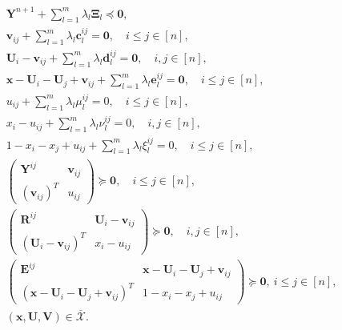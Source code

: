 \documentclass[opre,nonblindrev]{informs3} %
\begin{document}
\begin{theorem}
\begin{subequations}
\begin{align}
        &\quad \boldsymbol{Y}^{n+1} + \sum_{l=1}^{m} \lambda_l \boldsymbol{\Xi}_l \preceq \boldsymbol{0}, \label{eq:best_slc_degree4_f} \\
        &\quad \boldsymbol{v}_{ij} + \sum_{l=1}^{m} \lambda_{l} \boldsymbol{c}_l^{ij} = \boldsymbol{0}, \quad i \le j \in [n], \label{eq:best_slc_degree4_g}  \\ 
        &\quad \boldsymbol{U}_i - \boldsymbol{v}_{ij} + \sum_{l=1}^{m} \lambda_{l} \boldsymbol{d}_l^{ij} = \boldsymbol{0}, \quad i, j \in [n], \label{eq:best_slc_degree4_h}  \\
        &\quad \boldsymbol{x} - \boldsymbol{U}_i - \boldsymbol{U}_j + \boldsymbol{v}_{ij} + \sum_{l=1}^{m} \lambda_{l} \boldsymbol{e}_l^{ij} = \boldsymbol{0}, \quad i \le j \in [n], \label{eq:best_slc_degree4_i}  \\
        &\quad u_{ij} + \sum_{l=1}^{m} \lambda_l \mu_l^{ij} = 0, \quad i \le j \in [n], \label{eq:best_slc_degree4_j} \\ 
        &\quad x_i-u_{ij} + \sum_{l=1}^{m} \lambda_l \nu_l^{ij} = 0, \quad i,j \in [n], \label{eq:best_slc_degree4_k} \\  
        &\quad 1-x_i-x_j+u_{ij} + \sum_{l=1}^{m} \lambda_l \xi_l^{ij} = 0, \quad i \le j \in [n], \label{eq:best_slc_degree4_l} \\  
        &\quad \begin{pmatrix}
                \boldsymbol{Y}^{ij} & \boldsymbol{v}_{ij} \\
                \left(\boldsymbol{v}_{ij}\right)^T & u_{ij}
           \end{pmatrix} \succeq \boldsymbol{0}, \quad i \le j \in [n], \label{eq:best_slc_degree4_m} \\ 
       &\quad \begin{pmatrix}
                \boldsymbol{R}^{ij} & \boldsymbol{U}_i-\boldsymbol{v}_{ij} \\
                \left(\boldsymbol{U}_i-\boldsymbol{v}_{ij}\right)^T & x_i-u_{ij}
           \end{pmatrix} \succeq \boldsymbol{0}, \quad i,j \in [n], \label{eq:best_slc_degree4_n} \\ 
        &\quad \begin{pmatrix}
                \boldsymbol{E}^{ij} & \boldsymbol{x}-\boldsymbol{U}_i-\boldsymbol{U}_j+\boldsymbol{v}_{ij} \\
                \left( \boldsymbol{x}-\boldsymbol{U}_i-\boldsymbol{U}_j+\boldsymbol{v}_{ij} \right)^T & 1- x_i -x_j + u_{ij}
           \end{pmatrix} \succeq \boldsymbol{0}, \: i \le j \in [n], \label{eq:best_slc_degree4_l} \\ 
      &\quad \left( \boldsymbol{x}, \boldsymbol{U}, \boldsymbol{V} \right) \in \overline{\mathcal{X}}. \label{eq:best_slc_degree4_o}
			\end{align}
\end{subequations}
\end{theorem}  
\end{document}
